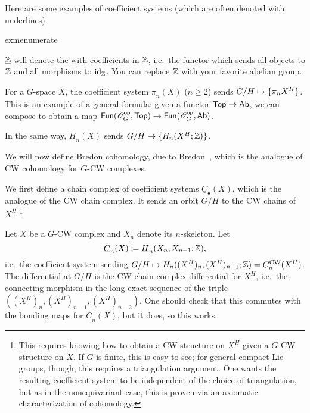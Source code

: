 Here are some examples of coefficient systems (which are often denoted with underlines).
\begin{comp}{exm}{enumerate}
	\item $\underline {\mathbb Z}$ will denote the  with coefficients in $\mathbb Z$, i.e.\ the
	functor which sends all objects to $\mathbb Z$ and all morphisms to $\mathrm{id}_\mathbb Z$. You can replace $\mathbb Z$ with your favorite
	abelian group.
	\item For a $G$-space $X$, the coefficient system $\underline\pi_n(X)$ ($n\ge 2$) sends $G/H\mapsto\set{\pi_nX^H}$. This is an example of
	a general formula: given a functor $\mathsf{Top}\to\mathsf{Ab}$, we can compose to obtain a map $\mathsf{Fun}(\mathscr O_G^{\mathsf{op}},
	\mathsf{Top})\to\mathsf{Fun}(\mathscr O_G^{\mathsf{op}}, \mathsf{Ab})$.
	\item In the same way, $\underline H_n(X)$ sends $G/H\mapsto\set{H_n(X^H;\Z)}$.\qedhere
\end{comp}
We will now define Bredon cohomology, due to Bredon~\cite{Bredon}, which is the analogue of CW cohomology for
$G$-CW complexes.
\begin{defn}
We first define a chain complex of coefficient systems $\underline C_\bullet(X)$, which is the analogue of the CW
chain complex. It sends an orbit $G/H$ to the CW chains of $X^H$.\footnote{This requires knowing how to obtain a CW
structure on $X^H$ given a $G$-CW structure on $X$. If $G$ is finite, this is easy to see; for general compact Lie
groups, though, this requires a triangulation argument. One wants the resulting coefficient system to be
independent of the choice of triangulation, but as in the nonequivariant case, this is proven via an axiomatic
characterization of cohomology.}

Let $X$ be a $G$-CW complex and $X_n$ denote its $n$-skeleton. Let
\[\underline C_n(X) \coloneqq \underline H_n(X_n, X_{n-1};\mathbb Z),\]
i.e.\ the coefficient system sending $G/H\mapsto H_n((X^H)_n, (X^H)_{n-1};\Z) = C_n^{\text{CW}}(X^H)$. The
differential at $G/H$ is the CW chain complex differential for $X^H$, i.e.\ the connecting morphism in the long
exact sequence of the triple $((X^H)_n, (X^H)_{n-1}, (X^H)_{n-2})$. One should check that this commutes with the
bonding maps for $\underline C_n(X)$, but it does, so this works.
\end{defn}
%
